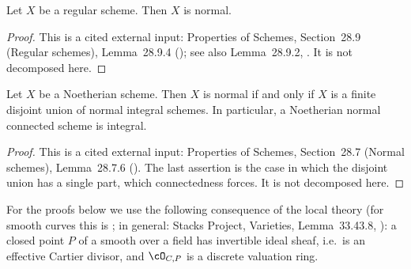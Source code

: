\begin{lemma}
\label{lem:pc-regular-is-normal}
Let $X$ be a regular scheme.  Then $X$ is normal.
\end{lemma}
\begin{proof}
This is a cited external input: Properties of Schemes, Section~28.9 (Regular
schemes), Lemma~28.9.4 (); see also Lemma~28.9.2,
.  It is not decomposed here.
\end{proof}

\begin{lemma}
\label{lem:pc-noetherian-normal-decomposition}
Let $X$ be a Noetherian scheme.  Then $X$ is normal if and only if $X$ is a
finite disjoint union of normal integral schemes.  In particular, a
Noetherian normal connected scheme is integral.
\end{lemma}
\begin{proof}
This is a cited external input: Properties of Schemes, Section~28.7 (Normal
schemes), Lemma~28.7.6 ().  The last assertion is the case
in which the disjoint union has a single part, which connectedness forces.  It
is not decomposed here.
\end{proof}

\begin{remark}\label{rem:pc-closed-point-cartier-sc}
For the proofs below we use the following consequence of the local
theory (for smooth curves this is ; in
general: Stacks Project, Varieties, Lemma~33.43.8,
): a closed point
$P$ of a smooth  over a field has
invertible ideal sheaf, i.e.\ is an effective Cartier divisor, and
$\cO_{C,P}$ is a discrete valuation ring.
\end{remark}

